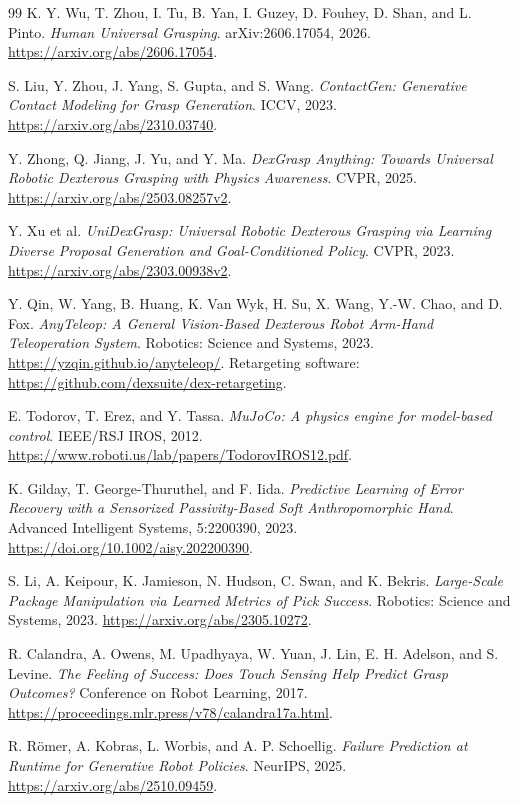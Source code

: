 \documentclass[10pt,letterpaper]{article}
\begin{document}
\begin{thebibliography}{99}
K. Y. Wu, T. Zhou, I. Tu, B. Yan, I. Guzey, D. Fouhey, D. Shan, and L. Pinto.
\emph{Human Universal Grasping}. arXiv:2606.17054, 2026.
\url{https://arxiv.org/abs/2606.17054}.

S. Liu, Y. Zhou, J. Yang, S. Gupta, and S. Wang.
\emph{ContactGen: Generative Contact Modeling for Grasp Generation}.
ICCV, 2023. \url{https://arxiv.org/abs/2310.03740}.

Y. Zhong, Q. Jiang, J. Yu, and Y. Ma.
\emph{DexGrasp Anything: Towards Universal Robotic Dexterous Grasping
with Physics Awareness}.
CVPR, 2025. \url{https://arxiv.org/abs/2503.08257v2}.

Y. Xu et al.
\emph{UniDexGrasp: Universal Robotic Dexterous Grasping via Learning
Diverse Proposal Generation and Goal-Conditioned Policy}.
CVPR, 2023. \url{https://arxiv.org/abs/2303.00938v2}.

Y. Qin, W. Yang, B. Huang, K. Van Wyk, H. Su, X. Wang, Y.-W. Chao, and D. Fox.
\emph{AnyTeleop: A General Vision-Based Dexterous Robot Arm-Hand Teleoperation
System}. Robotics: Science and Systems, 2023.
\url{https://yzqin.github.io/anyteleop/}. Retargeting software:
\url{https://github.com/dexsuite/dex-retargeting}.

E. Todorov, T. Erez, and Y. Tassa.
\emph{MuJoCo: A physics engine for model-based control}. IEEE/RSJ IROS, 2012.
\url{https://www.roboti.us/lab/papers/TodorovIROS12.pdf}.

K. Gilday, T. George-Thuruthel, and F. Iida.
\emph{Predictive Learning of Error Recovery with a Sensorized Passivity-Based
Soft Anthropomorphic Hand}. Advanced Intelligent Systems, 5:2200390, 2023.
\url{https://doi.org/10.1002/aisy.202200390}.

S. Li, A. Keipour, K. Jamieson, N. Hudson, C. Swan, and K. Bekris.
\emph{Large-Scale Package Manipulation via Learned Metrics of Pick Success}.
Robotics: Science and Systems, 2023.
\url{https://arxiv.org/abs/2305.10272}.

R. Calandra, A. Owens, M. Upadhyaya, W. Yuan, J. Lin, E. H. Adelson, and S. Levine.
\emph{The Feeling of Success: Does Touch Sensing Help Predict Grasp Outcomes?}
Conference on Robot Learning, 2017.
\url{https://proceedings.mlr.press/v78/calandra17a.html}.

R. R\"omer, A. Kobras, L. Worbis, and A. P. Schoellig.
\emph{Failure Prediction at Runtime for Generative Robot Policies}.
NeurIPS, 2025. \url{https://arxiv.org/abs/2510.09459}.


\end{thebibliography}
\end{document}

